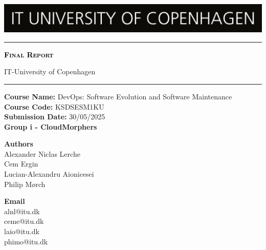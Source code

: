 \begin{titlepage}

\centering
\includegraphics[width=\textwidth]{images/FrontPage/ITU_logo_en.jpg}
	\textcolor{black}{\rule{\linewidth}{1pt}} \par
     {\scshape\Huge\bfseries \textcolor{black}{Final Report}\par} 
	\vspace{1pt}
	IT-University of Copenhagen
	\textcolor{black}{\rule{\linewidth}{1pt}} \par
	\vspace*{0.25cm}
 \textbf{Course Name:} DevOps: Software Evolution and Software Maintenance\\
\textbf{Course Code:} KSDSESM1KU\\
\textbf{Submission Date:} 30/05/2025\\
\textbf{Group i - CloudMorphers} \\
 
\vspace*{1cm}
 
\begin{minipage}{0.75\textwidth}
    \begin{flushleft}
        \textbf{Authors}\\
        Alexander Niclas Lerche\\
        Cem Ergin\\
        Lucian-Alexandru Aionicesei\\
        Philip Mørch
    \end{flushleft}
    \end{minipage}
    \begin{minipage}{0.20\textwidth}
    \begin{flushright}
        \textbf{Email}\\
        alnl@itu.dk\\
        ceme@itu.dk\\
        laio@itu.dk\\
        phimo@itu.dk
    \end{flushright}
\end{minipage}

\end{titlepage}
